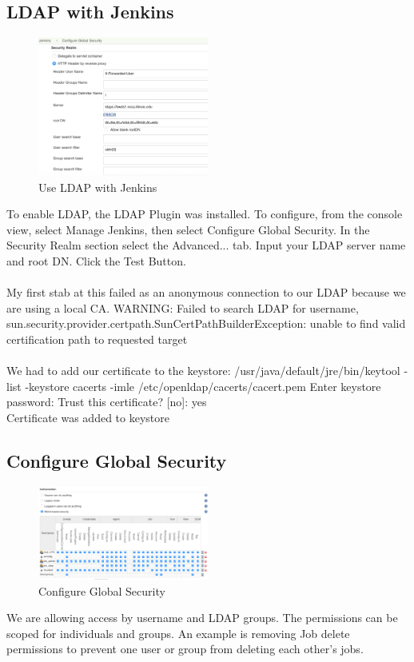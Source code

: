 \documentclass[10pt, conference, compsocconf]{IEEEtran}
\begin{document}
\subsection{LDAP with Jenkins}
\begin{figure}[H]
\centering
\includegraphics[width=0.5\textwidth]{LDAP-Jenkins}
\caption{ Use LDAP with Jenkins }
\label{fig:LDAP-Jenkins}
\end{figure}
To enable LDAP, the LDAP Plugin was installed. To configure, from the console view, select Manage Jenkins, then select Configure Global Security. In the Security Realm section select the Advanced... tab. Input your LDAP server name and root DN. Click the Test Button.\\
\\
My first stab at this failed as an anonymous connection to our LDAP because we are using a local CA.
WARNING: Failed to search LDAP for username, 
sun.security.provider.certpath.SunCertPathBuilderException:
unable to find valid certification path to requested target\\
\\
We had to add our certificate to the keystore:
/usr/java/default/jre/bin/keytool -list -keystore cacerts -imle /etc/openldap/cacerts/cacert.pem
Enter keystore password: Trust this certificate? [no]:  yes\\
Certificate was added to keystore

\subsection{Configure Global Security}
\begin{figure}[H]
\centering
\includegraphics[width=0.5\textwidth]{Configure-Global-Security}
\caption{ Configure Global Security }
\label{fig:Configure-Global-Security}
\end{figure}
We are allowing access by username and LDAP groups. The permissions can be scoped for individuals and groups. An example is removing Job delete permissions to prevent one user or group from deleting each other's jobs. 
\end{document}
